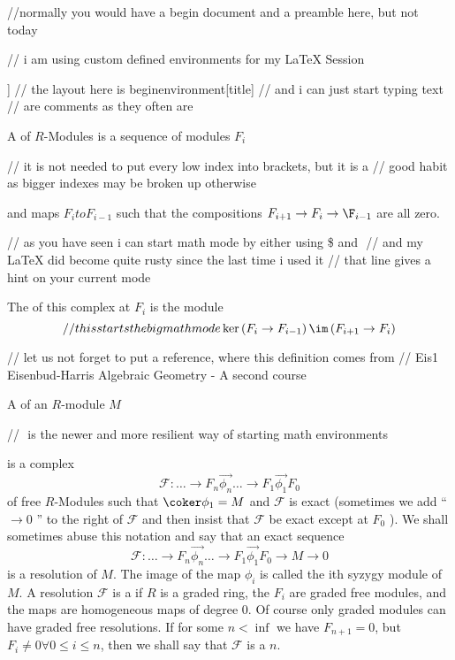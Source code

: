 //normally you would have a begin document and a preamble here, but not today

// i am using custom defined environments for my LaTeX Session

\begin{defn}[Complex of $R$-modules \nocite[Eis1]{1.10} ]
// the layout here is begin{environment}[title]
// and i can just start typing text
// are comments as they often are

A  of $R$-Modules is a sequence of modules \( F_{i} \)

// it is not needed to put every low index into brackets, but it is a 
// good habit as bigger indexes may be broken up otherwise

and maps \( F_{i} to F_{i-1} \) such that the compositions \( F_{i+1} \to F_{i} \to \F_{i-1} \) are all zero.

// as you have seen i can start math mode by either using  \$ and \(  \) 
// and my LaTeX did become quite rusty since the last time i used it
// that line gives a hint on your current mode

The  of this complex at \( F_{i} \) is the module 
\[
	// this starts the big math mode
	\ker \left( F_{i} \to F_{i-1} \right)   \/ \im \left( F_{i+1} \to F_{i} \right)
\]

// let us not forget to put a reference, where this definition comes from
// Eis1 Eisenbud-Harris Algebraic Geometry - A second course

A  of an \( R\)-module \( M \)

// \( \) is the newer and more resilient way of starting math environments

is a complex
\[
	\mathcal{F}: \hdots \to F_{n} \overset{\to}{\phi_{n}} 
	\hdots \to F_{1} \overset{\to}{\phi_{1}} F_{0}
\]
of free \(R\)-Modules such that \( \coker \phi_{1} = M \) 
and \( \mathcal{F} \)  is exact (sometimes we add `` \( \to 0 \) '' to the right of \(\mathcal{F}\) and then insist that \(\mathcal{F}\) be exact except at \( F_{0} \) ).
We shall sometimes abuse this notation and say that an exact sequence 
\[
	\mathcal{F}: \hdots \to F_{n} \overset{\to}{\phi_{n}} 
	\hdots \to F_{1} \overset{\to}{\phi_{1}} F_{0}
	\to M \to 0
\]
is a resolution of \( M \).  
The image of the map \( \phi_i \) is called the ith syzygy module of \(M \).
A resolution \( \mathcal{F }\) is a  if \( R \) is a graded ring, the \(  F_{i}\) are graded free modules, and the maps are homogeneous maps of degree 0.
Of course only graded modules can have graded free resolutions.
If for some \( n < \inf \) we have \( F_{n+1}=0 \), 
but \( F_{i} \neq 0 \forall 0 \le i \le n \), then we shall say that 
\( \mathcal{F}\) is a  \( n\).
\end{defn}

